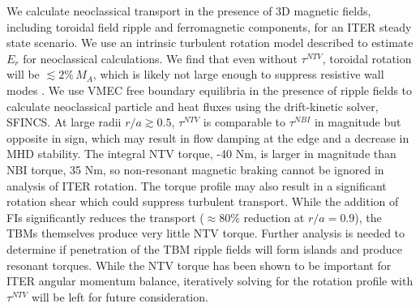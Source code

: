 \documentclass{article}
\numberwithin{figure}{section}
\numberwithin{equation}{section}
\begin{document}
We calculate neoclassical transport in the presence of 3D magnetic fields, including toroidal field ripple and ferromagnetic components, for an ITER steady state scenario. We use an intrinsic turbulent rotation model described to estimate $E_r$ for neoclassical calculations. We find that even without $\tau^{NTV}$, toroidal rotation will be $\lesssim 2\% \,M_A$, which is likely not large enough to suppress resistive wall modes \cite{Liu2004}. We use VMEC free boundary equilibria in the presence of ripple fields to calculate neoclassical particle and heat fluxes using the drift-kinetic solver, SFINCS. At large radii $r/a \gtrsim 0.5$, $\tau^{NTV}$ is comparable to $\tau^{NBI}$ in magnitude but opposite in sign, which may result in flow damping at the edge and a decrease in MHD stability. The integral NTV torque, -40 Nm, is larger in magnitude than NBI torque, 35 Nm, so non-resonant magnetic braking cannot be ignored in analysis of ITER rotation. The torque profile may also result in a significant rotation shear which could suppress turbulent transport. While the addition of FIs significantly reduces the transport ($\approx 80\%$ reduction at $r/a = 0.9$), the TBMs themselves produce very little NTV torque. Further analysis is needed to determine if penetration of the TBM ripple fields will form islands and produce resonant torques. While the NTV torque has been shown to be important for ITER angular momentum balance, iteratively solving for the rotation profile with $\tau^{NTV}$ will be left for future consideration.

\appendix
\end{document}
